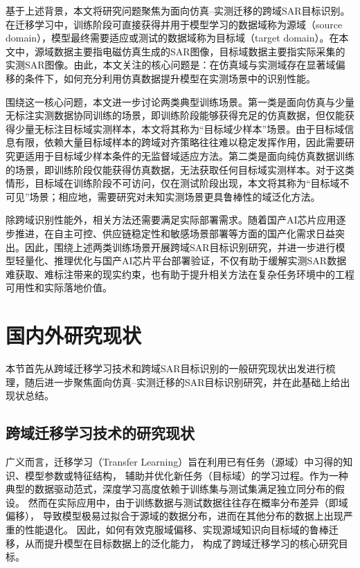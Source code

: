 基于上述背景，本文将研究问题聚焦为面向仿真--实测迁移的跨域SAR目标识别。在迁移学习中，训练阶段可直接获得并用于模型学习的数据域称为源域（source domain），模型最终需要适应或测试的数据域称为目标域（target domain）。在本文中，源域数据主要指电磁仿真生成的SAR图像，目标域数据主要指实际采集的实测SAR图像。由此，本文关注的核心问题是：在仿真域与实测域存在显著域偏移的条件下，如何充分利用仿真数据提升模型在实测场景中的识别性能。

围绕这一核心问题，本文进一步讨论两类典型训练场景。第一类是面向仿真与少量无标注实测数据协同训练的场景，即训练阶段能够获得充足的仿真数据，但仅能获得少量无标注目标域实测样本，本文将其称为“目标域少样本”场景。由于目标域信息有限，依赖大量目标域样本的跨域对齐策略往往难以稳定发挥作用，因此需要研究更适用于目标域少样本条件的无监督域适应方法。第二类是面向纯仿真数据训练的场景，即训练阶段仅能获得仿真数据，无法获取任何目标域实测样本。对于这类情形，目标域在训练阶段不可访问，仅在测试阶段出现，本文将其称为“目标域不可见”场景；相应地，需要研究对未知实测场景更具鲁棒性的域泛化方法。

除跨域识别性能外，相关方法还需要满足实际部署需求。随着国产AI芯片应用逐步推进，在自主可控、供应链稳定性和敏感场景部署等方面的国产化需求日益突出\cite{钱贵明2025ai}。因此，围绕上述两类训练场景开展跨域SAR目标识别研究，并进一步进行模型轻量化、推理优化与国产AI芯片平台部署验证，不仅有助于缓解实测SAR数据难获取、难标注带来的现实约束，也有助于提升相关方法在复杂任务环境中的工程可用性和实际落地价值。

\section{国内外研究现状}
本节首先从跨域迁移学习技术和跨域SAR目标识别的一般研究现状出发进行梳理，随后进一步聚焦面向仿真--实测迁移的SAR目标识别研究，并在此基础上给出现状总结。
\subsection{跨域迁移学习技术的研究现状}
广义而言，迁移学习（Transfer Learning）旨在利用已有任务（源域）中习得的知识、模型参数或特征结构，
辅助并优化新任务（目标域）的学习过程。作为一种典型的数据驱动范式，深度学习高度依赖于训练集与测试集满足独立同分布的假设。
然而在实际应用中，由于训练数据与测试数据往往存在概率分布差异（即域偏移），
导致模型极易过拟合于源域的数据分布，进而在其他分布的数据上出现严重的性能退化。
因此，如何有效克服域偏移、实现源域知识向目标域的鲁棒迁移，从而提升模型在目标数据上的泛化能力，
构成了跨域迁移学习的核心研究目标\cite{zhuang2020comprehensive}。

